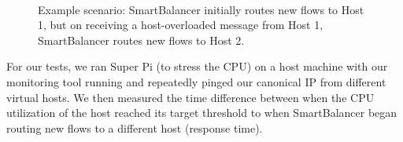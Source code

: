 \documentclass[10pt]{article}
\begin{document}
\begin{figure}[ht!]
     \begin{center}
	\\
    \end{center}
    \caption{Example scenario: SmartBalancer initially routes new flows to Host 1, but on receiving a host-overloaded message from Host 1, SmartBalancer routes new flows to Host 2.}
   \label{fig:subfigures}
\end{figure}
For our tests, we ran Super Pi (to stress the CPU) on a host machine with our monitoring tool running and repeatedly pinged our canonical IP from different virtual hosts. We then measured the time difference between when the CPU utilization of the host reached its target threshold to when SmartBalancer began routing new flows to a different host (response time).
\end{document}
